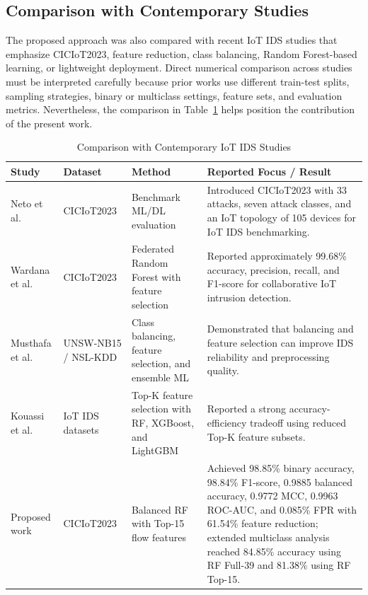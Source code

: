 \documentclass[journal]{IEEEtran}
\begin{document}
\subsection{Comparison with Contemporary Studies}

The proposed approach was also compared with recent IoT IDS studies that emphasize CICIoT2023, feature reduction, class balancing, Random Forest-based learning, or lightweight deployment. Direct numerical comparison across studies must be interpreted carefully because prior works use different train-test splits, sampling strategies, binary or multiclass settings, feature sets, and evaluation metrics. Nevertheless, the comparison in Table~\ref{tab:related_study_comparison} helps position the contribution of the present work.

\begin{table}[htbp]
\caption{Comparison with Contemporary IoT IDS Studies}
\label{tab:related_study_comparison}
\centering
\scriptsize
\begin{tabular}{p{2.6cm} p{2.0cm} p{3.3cm} p{6.6cm}}
\toprule
\textbf{Study} & \textbf{Dataset} & \textbf{Method} & \textbf{Reported Focus / Result} \\
\midrule
Neto et al. \cite{neto2023ciciot} & CICIoT2023 & Benchmark ML/DL evaluation & Introduced CICIoT2023 with 33 attacks, seven attack classes, and an IoT topology of 105 devices for IoT IDS benchmarking. \\
Wardana et al. \cite{wardana2024frf} & CICIoT2023 & Federated Random Forest with feature selection & Reported approximately 99.68\% accuracy, precision, recall, and F1-score for collaborative IoT intrusion detection. \\
Musthafa et al. \cite{musthafa2024balanced} & UNSW-NB15 / NSL-KDD & Class balancing, feature selection, and ensemble ML & Demonstrated that balancing and feature selection can improve IDS reliability and preprocessing quality. \\
Kouassi et al. \cite{kouassi2025topk} & IoT IDS datasets & Top-K feature selection with RF, XGBoost, and LightGBM & Reported a strong accuracy-efficiency tradeoff using reduced Top-K feature subsets. \\
Proposed work & CICIoT2023 & Balanced RF with Top-15 flow features & Achieved 98.85\% binary accuracy, 98.84\% F1-score, 0.9885 balanced accuracy, 0.9772 MCC, 0.9963 ROC-AUC, and 0.085\% FPR with 61.54\% feature reduction; extended multiclass analysis reached 84.85\% accuracy using RF Full-39 and 81.38\% using RF Top-15. \\
\bottomrule
\end{tabular}
\end{table}
\end{document}
